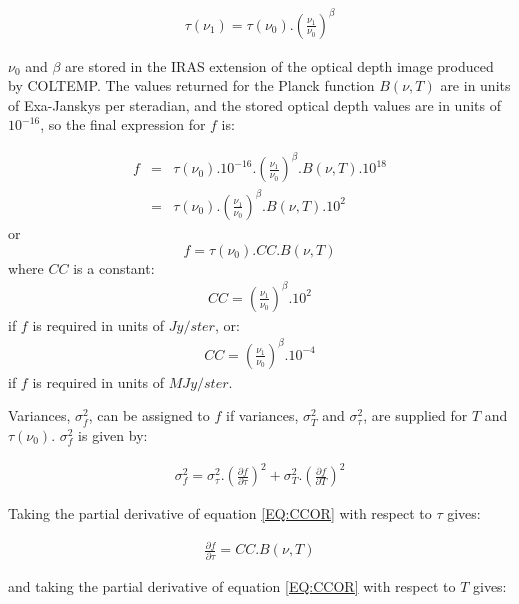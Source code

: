 \begin{eqnarray*}
\tau(\nu_{1}) = \tau(\nu_{0}) . \left(\frac{\nu_{1}}{\nu_{0}}\right)^{\beta}
\end{eqnarray*}

$\nu_{0}$ and $\beta$ are stored in the {\small IRAS} extension of the optical 
depth image produced by {\small COLTEMP}. The values returned for the Planck 
function $B(\nu, T)$ are in units of Exa-Janskys per steradian, and the stored 
optical depth values are in units of $10^{-16}$, so the final expression for $f$ 
is:

\begin{eqnarray*}
f & = & \tau(\nu_{0}).10^{-16}.\left(\frac{\nu_{1}}{\nu_{0}}\right)^{\beta}.
        B( \nu, T ).10^{18}\\
  & = & \tau(\nu_{0}).\left(\frac{\nu_{1}}{\nu_{0}}\right)^{\beta}.
        B( \nu, T ).10^{2}
\end{eqnarray*}
or
\begin{equation}
\label{EQ:CCOR}
  f = \tau(\nu_{0}).CC.B( \nu, T )
\end{equation}
where $CC$ is a constant:
\begin{eqnarray*}
CC  =  \left(\frac{\nu_{1}}{\nu_{0}}\right)^{\beta}.10^{2}
\end{eqnarray*}
if $f$ is required in units of $Jy/ster$, or:
\begin{eqnarray*}
CC  =  \left(\frac{\nu_{1}}{\nu_{0}}\right)^{\beta}.10^{-4}
\end{eqnarray*}
if $f$ is required in units of $MJy/ster$.

Variances, $\sigma_{f}^{2}$, can be assigned to $f$ if variances,
$\sigma_{T}^{2}$ and $\sigma_{\tau}^{2}$, are supplied for $T$ and
$\tau(\nu_{0})$. $\sigma_{f}^{2}$ is given by:

\begin{eqnarray*}
\sigma_{f}^{2} = \sigma_{\tau}^{2}.\left( \frac{\partial f}{\partial 
\tau}\right)^{2} + \sigma_{T}^{2}.\left( \frac{\partial f}{\partial T}\right)^{2}
\end{eqnarray*}

Taking the partial derivative of equation \ref{EQ:CCOR} with respect to $\tau$ 
gives:

\begin{eqnarray*}
\frac{\partial f}{\partial \tau} = CC.B(\nu, T )
\end{eqnarray*}

and taking the partial derivative of equation \ref{EQ:CCOR} with respect to
$T$ gives: 

